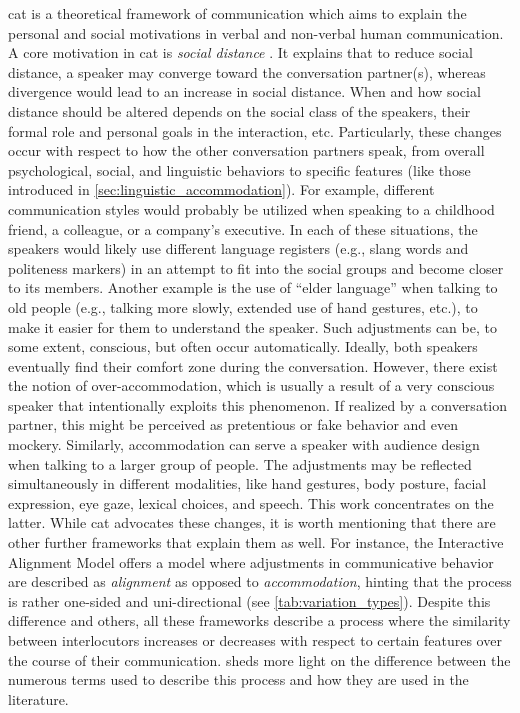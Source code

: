 \Acf{cat} is a theoretical framework of communication which aims to explain the personal and social motivations in verbal and non-verbal human communication.
A core motivation in \ac{cat} is \emph{social distance} \citep{Giles1973mobility, Giles1991CAT, Giles2007CAT}.
It explains that to reduce social distance, a speaker may converge toward the conversation partner(s), whereas divergence would lead to an increase in social distance.
When and how social distance should be altered depends on the social class of the speakers, their formal role and personal goals in the interaction, etc.
Particularly, these changes occur with respect to how the other conversation partners speak, from overall psychological, social, and linguistic behaviors to specific features (like those introduced in \cref{sec:linguistic_accommodation}).
For example, different communication styles would probably be utilized when speaking to a childhood friend, a colleague, or a company's executive.
In each of these situations, the speakers would likely use different language registers (e.g., slang words and politeness markers) in an attempt to fit into the social groups and become closer to its members.
Another example is the use of \enquote{elder language} when talking to old people (e.g., talking more slowly, extended use of hand gestures, etc.), to make it easier for them to understand the speaker.
Such adjustments can be, to some extent, conscious, but often occur automatically.
Ideally, both speakers eventually find their comfort zone during the conversation.
However, there exist the notion of over-accommodation, which is usually a result of a very conscious speaker that intentionally exploits this phenomenon.
If realized by a conversation partner, this might be perceived as pretentious or fake behavior and even mockery.
Similarly, accommodation can serve a speaker with audience design when talking to a larger group of people.
The adjustments may be reflected simultaneously in different modalities, like hand gestures, body posture, facial expression, eye gaze, lexical choices, and speech.
This work concentrates on the latter.
While \ac{cat} advocates these changes, it is worth mentioning that there are other further frameworks that explain them as well.
For instance, the Interactive Alignment Model \citep{Pickering2004behavioral, Pickering2013integrated} offers a model where adjustments in communicative behavior are described as \emph{alignment} as opposed to \emph{accommodation}, hinting that the process is rather one-sided and uni-directional (see \cref{tab:variation_types}).
Despite this difference and others, all these frameworks describe a process where the similarity between interlocutors increases or decreases with respect to certain features over the course of their communication.
 sheds more light on the difference between the numerous terms used to describe this process and how they are used in the literature.


